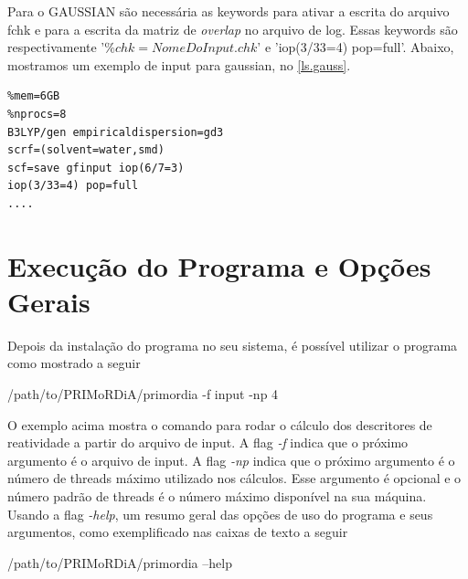 \documentclass[a4paper,11pt]{refart}
\begin{document}
Para o GAUSSIAN são necessária as keywords para ativar a escrita do arquivo fchk e para a escrita da matriz de \textit{overlap} no arquivo de log. Essas keywords são respectivamente '$\%chk=NomeDoInput.chk$'  e 'iop(3/33=4) pop=full'. Abaixo, mostramos um exemplo de input para gaussian, no \autoref{ls.gauss}. 
 
\begin{minipage}{\textwidth}
\begin{lstlisting}[caption={Exemplo de input para o GAUSSIAN},label={ls.gauss}]
%chk=Fe_DFO_s2_nuevo.chk
%mem=6GB
%nprocs=8
B3LYP/gen empiricaldispersion=gd3 
scrf=(solvent=water,smd)
scf=save gfinput iop(6/7=3)
iop(3/33=4) pop=full
....
\end{lstlisting}
\end{minipage}

\newpage
\section{Execução do Programa e Opções Gerais}

Depois da instalação do programa no seu sistema, é possível utilizar o programa como mostrado a seguir

\hspace*{-\leftmarginwidth}
\begin{minipage}{\fullwidth}
\begin{commandshell}
/path/to/PRIMoRDiA/primordia -f input -np 4 	
\end{commandshell}
\end{minipage}

O exemplo acima mostra o comando para rodar o cálculo dos descritores de reatividade a partir do arquivo de input. A flag \emph{-f} indica que o próximo argumento é o arquivo de input. A flag \emph{-np} indica que o próximo argumento é o número de threads máximo utilizado nos cálculos. Esse argumento é opcional e o número padrão de threads é o número máximo disponível na sua máquina. Usando a flag \emph{-help}, um resumo geral das opções de uso do programa e seus argumentos, como exemplificado nas caixas de texto a seguir


\hspace*{-\leftmarginwidth}
\begin{minipage}{\fullwidth}
\begin{commandshell}
/path/to/PRIMoRDiA/primordia --help
\end{commandshell}
\end{minipage}
\end{document}
